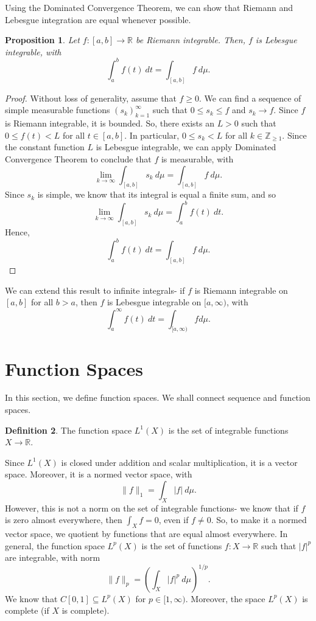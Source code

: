 \documentclass[a4paper, openany]{memoir}
\theoremstyle{definition}
\newtheorem{definition}{Definition}[section]
\theoremstyle{plain}
\newtheorem{proposition}[definition]{Proposition}
\begin{document}
    Using the Dominated Convergence Theorem, we can show that Riemann and Lebesgue integration are equal whenever possible.
    \begin{proposition}
        Let $f \colon [a, b] \to \mathbb{R}$ be Riemann integrable. Then, $f$ is Lebesgue integrable, with 
        \[ \int_{a}^{b} f(t) \ dt = \int_{[a, b]} f \ d\mu.\]
    \end{proposition}
    \begin{proof}
        Without loss of generality, assume that $f \geq 0$. We can find a sequence of simple measurable functions $(s_k)_{k=1}^\infty$ such that $0 \leq s_k \leq f$ and $s_k \to f$. Since $f$ is Riemann integrable, it is bounded. So, there exists an $L > 0$ such that $0 \leq f(t) < L$ for all $t \in [a, b]$. In particular, $0 \leq s_k < L$ for all $k \in \mathbb{Z}_{\geq 1}$. Since the constant function $L$ is Lebesgue integrable, we can apply Dominated Convergence Theorem to conclude that $f$ is measurable, with
        \[\lim_{k \to \infty} \int_{[a, b]} s_k \ d\mu = \int_{[a, b]} f \ d\mu.\]
        Since $s_k$ is simple, we know that its integral is equal a finite sum, and so
        \[\lim_{k \to \infty} \int_{[a, b]} s_k \ d\mu = \int_{a}^{b} f(t) \ dt.\]
        Hence,
        \[ \int_{a}^{b} f(t) \ dt = \int_{[a, b]} f \ d\mu.\]
    \end{proof}
    \noindent We can extend this result to infinite integrals- if $f$ is Riemann integrable on $[a, b]$ for all $b > a$, then $f$ is Lebesgue integrable on $[a, \infty)$, with
    \[\int_{a}^{\infty} f(t) \ dt = \int_{[a, \infty)} f  d\mu.\]
    \newpage

    \section{Function Spaces}
    In this section, we define function spaces. We shall connect sequence and function spaces.

    \begin{definition}
        The function space $L^1(X)$ is the set of integrable functions $X \to \mathbb{R}$.
    \end{definition}
    \noindent Since $L^1(X)$ is closed under addition and scalar multiplication, it is a vector space. Moreover, it is a normed vector space, with
    \[\lVert f \rVert_1 = \int_{X} |f| \ d\mu.\]
    However, this is not a norm on the set of integrable functions- we know that if $f$ is zero almost everywhere, then $\int_X f = 0$, even if $f \neq 0$. So, to make it a normed vector space, we quotient by functions that are equal almost everywhere. In general, the function space $L^p(X)$ is the set of functions $f \colon X \to \mathbb{R}$ such that $|f|^p$ are integrable, with norm
    \[\lVert f \rVert_p = \left(\int_X |f|^p \ d\mu\right)^{1/p}.\]
    We know that $C[0, 1] \subseteq L^p(X)$ for $p \in [1, \infty)$. Moreover, the space $L^p(X)$ is complete (if $X$ is complete).
\end{document}
